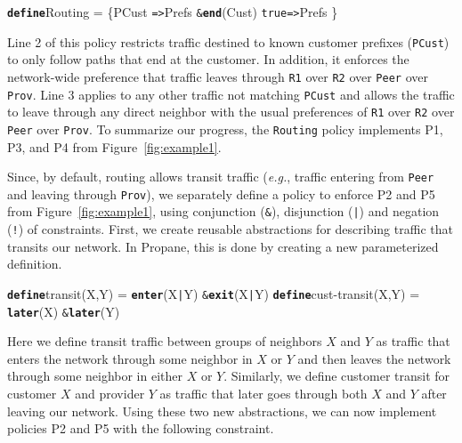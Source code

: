 \documentclass[10pt]{sigalternate052015}
\newcommand{\EG}{\emph{e.g.}}
\newcommand{\sysname}{{\small \sf Propane}\xspace}
\newcommand{\CD}[1]{\texttt{\small #1}}  %
\newcommand{\KW}[1]{\texttt{\small\bfseries{#1}}}
\newcommand{\True}{\CD{true}}
\newcommand{\Define}{\KW{define}}
\newcommand{\Path}{\texttt{=>}}
\newcommand{\AND}{\texttt{\&}}
\newcommand{\OR}{\texttt{|}}
\newcommand{\NOT}{\texttt{!}}
\newcommand{\Exit}{\KW{exit}}
\newcommand{\End}{\KW{end}}
\newcommand{\Enter}{\KW{enter}}
\newcommand{\Later}{\KW{later}}
\renewcommand{\path}[2]{ #1 \mapsto \ensuremath{#2} }
\begin{document}

\begin{code}
\Define Routing = 
    \{PCust \Path Prefs \AND \End(Cust)
     \True  \Path Prefs \}
\end{code}
\noindent

Line 2 of this policy 
restricts traffic destined to known customer prefixes (\CD{PCust}) to only follow paths that end at the customer. In addition, it enforces the network-wide preference that traffic leaves through \CD{R1} over \CD{R2} over \CD{Peer} over \CD{Prov}.
Line 3 applies to any other traffic not matching \CD{PCust} and allows the traffic to leave through any direct neighbor with the usual preferences of \CD{R1} over \CD{R2} over \CD{Peer} over \CD{Prov}. To summarize our progress, the \CD{Routing} policy
implements P1, P3, and P4 from Figure~\ref{fig:example1}.


Since, by default, routing allows transit traffic (\EG, traffic entering from
\CD{Peer} and leaving through \CD{Prov}), we separately define a
policy to enforce P2 and P5 from Figure~\ref{fig:example1}, using conjunction (\AND),
disjunction (\OR) and negation (\NOT) of constraints. 
First, we create reusable abstractions for describing traffic that transits our network. In \sysname, this is done by creating a new parameterized definition.
\begin{code}
\Define transit(X,Y) = \Enter(X{\OR}Y) \AND \Exit(X{\OR}Y)
\Define cust-transit(X,Y) = \Later(X) \AND \Later(Y)
\end{code}
\noindent
Here we define transit traffic between groups of neighbors $X$ and $Y$ as traffic that enters the network through some neighbor in $X$ or $Y$ and then leaves the network through some neighbor in either $X$ or $Y$. Similarly, we define customer transit for customer $X$ and provider $Y$ as traffic that later goes through both $X$ and $Y$ after leaving our network. Using these two new abstractions, we can now implement policies P2 and P5 with the following constraint.
\end{document}
